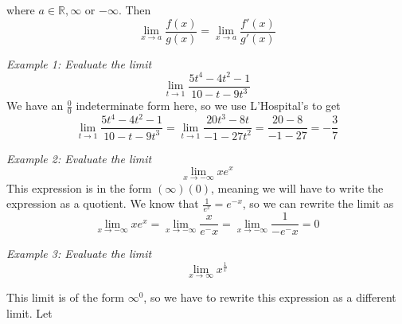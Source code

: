         \noindent where $a\in\mathbb{R}, \infty$ or $-\infty$. Then \\

        \begin{equation*}
            \lim_{x\to a}\frac{f(x)}{g(x)}=\lim_{x\to a}\frac{f'(x)}{g'(x)}
        \end{equation*}

        \noindent \color{blue} \textit{Example 1: Evaluate the limit} \\

        \begin{equation*}
            \lim_{t\to 1}\frac{5t^4-4t^2-1}{10-t-9t^3}
        \end{equation*}
        \color{black} We have an $\frac{0}{0}$ indeterminate form here, so we use L'Hospital's to get \\

        \begin{equation}
            \lim_{t\to 1}\frac{5t^4-4t^2-1}{10-t-9t^3}=\lim_{t\to 1}\frac{20t^3-8t}{-1-27t^2}
            =\frac{20-8}{-1-27}=-\frac{3}{7}
        \end{equation}

        \noindent \color{blue} \textit{Example 2: Evaluate the limit} \\

        \begin{equation*}
            \lim_{x\to-\infty}xe^x
        \end{equation*}
        \color{black} This expression is in the form $(\infty)(0)$, meaning we will have to write
        the expression as a quotient. We know that $\frac{1}{e^x}=e^{-x}$, so we can rewrite the
        limit as \\

        \begin{equation*}
            \lim_{x\to-\infty}xe^x=\lim_{x\to-\infty}\frac{x}{e^-x}=\lim_{x\to-\infty} \frac{1}{-e^-x}=0
        \end{equation*}

        \noindent \color{blue} \textit{Example 3: Evaluate the limit} \\

        \begin{equation*}
            \lim_{x\to\infty}x^{\frac{1}{x}}
        \end{equation*} \color{black}

        \noindent This limit is of the form $\infty^0$, so we have to rewrite this expression as a different
        limit. Let \\

